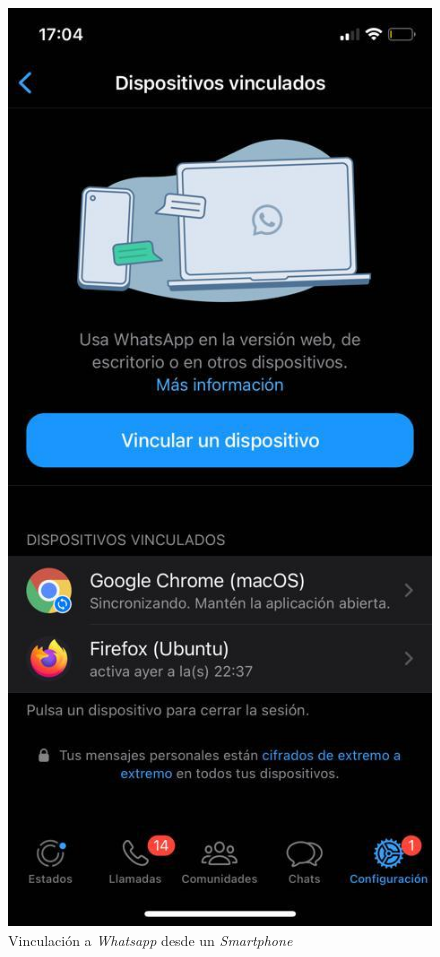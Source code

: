 \begin{figure}[H]
	\centering
	\includegraphics[scale=.20]{./Figures/ensayo-1/15.qr-api.jpeg}
	\caption{Vinculación a \textit{Whatsapp} desde un \textit{Smartphone}}
	\label{fig:ensayomensaje1}
\end{figure}

